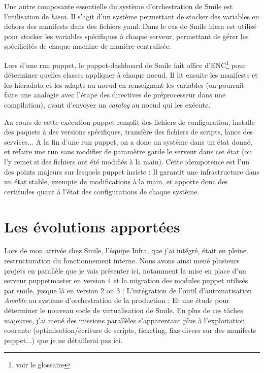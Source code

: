 \documentclass[14 pt]{extreport}
\begin{document}
\newpage
Une autre composante essentielle du système d'orchestration de Smile est l'utilisation de \emph{hiera}. Il s'agit d'un système permettant de stocker des variables en dehors des manifests dans des fichiers yaml. Dans le cas de Smile hiera est utilisé pour stocker les variables spécifiques à chaque serveur, permettant de gérer les spécificités de chaque machine de manière centralisée.

Lors d'une run puppet, le puppet-dashboard de Smile fait office d'ENC\footnote{voir le glossaire} pour déterminer quelles classes appliquer à chaque noeud. Il lit ensuite les manifests et les hieradata et les adapte au noeud en renseignant les variables (on pourrait faire une analogie avec l'étape des directives de préprocesseur dans une compilation), avant d'envoyer un \emph{catalog} au noeud qui les exécute.

Au cours de cette exécution puppet remplit des fichiers de configuration, installe des paquets à des versions spécifiques, transfère des fichiers de scripts, lance des services... A la fin d'une run puppet, on a donc un système dans un état donné, et refaire une run sans modifier de paramètre garde le serveur dans cet état (ou l'y remet si des fichiers ont été modifiés à la main). Cette idempotence est l'un des points majeurs sur lesquels puppet insiste : Il garantit une infrastructure dans un état stable, exempte de modifications à la main, et apporte donc des certitudes quant à l'état des configurations de chaque système.

\chapter{Les évolutions apportées}

Lors de mon arrivée chez Smile, l'équipe Infra, que j'ai intégré, était en pleine restructuration du fonctionnement interne. Nous avons ainsi mené plusieurs projets en parallèle que je vais présenter ici, notamment la mise en place d'un serveur puppetmaster en version 4 et la migration des modules puppet utilisés par smile, jusque là en version 2 ou 3 ; L'intégration de l'outil d'automatisation \emph{Ansible} au système d'orchestration de la production ; Et une étude pour déterminer le nouveau socle de virtualisation de Smile. En plus de ces tâches majeures, j'ai mené des missions parallèles s'apparentant plus à l'exploitation courante (optimisation/écriture de scripts, ticketing, fixs divers sur des manifests puppet...) que je ne détaillerai pas ici.
\end{document}
